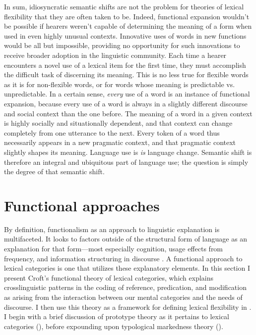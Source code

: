 In sum, idiosyncratic semantic shifts are not the problem for theories of lexical flexibility that they are often taken to be. Indeed, functional expansion wouldn't be possible if hearers weren't capable of determining the meaning of a form when used in even highly unusual contexts. Innovative uses of words in new functions would be all but impossible, providing no opportunity for such innovations to receive broader adoption in the linguistic community. Each time a hearer encounters a novel use of a lexical item for the first time, they must accomplish the difficult task of discerning its meaning. This is no less true for flexible words as it is for non-flexible words, or for words whose meaning is predictable vs. unpredictable. In a certain sense, \emph{every} use of a word is an instance of functional expansion, because every use of a word is always in a slightly different discourse and social context than the one before. The meaning of a word in a given context is highly socially and situationally dependent, and that context can change completely from one utterance to the next. Every token of a word thus necessarily appears in a new pragmatic context, and that pragmatic context slightly shapes its meaning. Language use is \emph{is} language change. Semantic shift is therefore an integral and ubiquitous part of language use; the question is simply the degree of that semantic shift.

\section{Functional approaches}
\label{sec:2.4}

By definition, functionalism as an approach to linguistic explanation is multifaceted. It looks to factors outside of the structural form of language as an explanation for that form—most especially cognition, usage effects from frequency, and information structuring in discourse \parencite[6323--6324]{Croft2001a}. A functional approach to lexical categories is one that utilizes these explanatory elements. In this section I present Croft's \parencites*{Croft1991}{Croft2000}{Croft2001b} functional theory of lexical categories, which explains crosslinguistic patterns in the coding of reference, predication, and modification as arising from the interaction between our mental categories and the needs of discourse. I then use this theory as a framework for defining lexical flexibility in . I begin with a brief discussion of prototype theory as it pertains to lexical categories (), before expounding upon typological markedness theory ().

